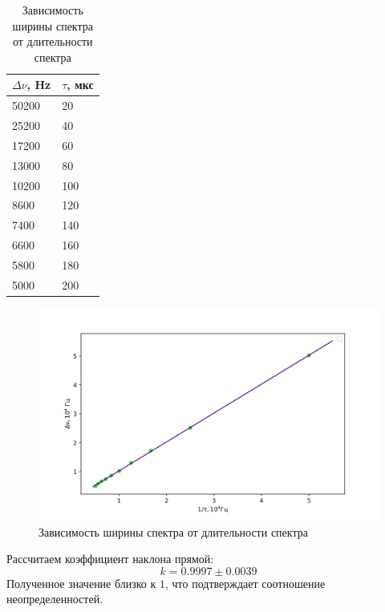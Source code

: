 \documentclass[a4paper,12pt]{article} %
\begin{document}
\begin{table}[h!]
\caption{Зависимость ширины спектра от длительности спектра} \label{dnu(tau)_tbl}
\begin{tabular}{|l|l|}
\hline
$\Delta\nu$, Hz & $\tau$, мкс \\ \hline
50200         & 20       \\ \hline
25200         & 40       \\ \hline
17200         & 60       \\ \hline
13000         & 80       \\ \hline
10200         & 100      \\ \hline
8600          & 120      \\ \hline
7400          & 140      \\ \hline
6600          & 160      \\ \hline
5800          & 180      \\ \hline
5000          & 200      \\ \hline
\end{tabular}
\end{table}

\begin{figure}[h!]
\begin{center}
\includegraphics[width=\textwidth]{dnu(tau)}
\caption{Зависимость ширины спектра от длительности спектра} \label{dnu(tau)_img}
\end{center}
\end{figure}
Рассчитаем коэффициент наклона прямой:
\begin{equation}
k = 0.9997 \pm 0.0039
\end{equation}
Полученное значение близко к $1$, что подтверждает соотношение неопределенностей. 
\end{document}
